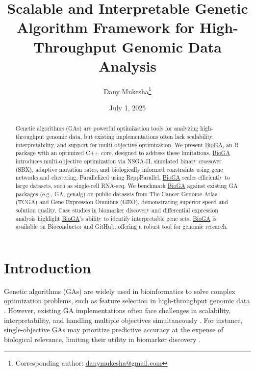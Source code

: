 \documentclass{report}
\begin{document}
\title{Scalable and Interpretable Genetic Algorithm Framework for High-Throughput Genomic Data Analysis}
\author{Dany Mukesha\thanks{Corresponding author: \href{mailto:danymukesha@gmail.com}{danymukesha@gmail.com}}}
\date{July 1, 2025}
\maketitle

\begin{abstract}
Genetic algorithms (GAs) are powerful optimization tools for analyzing high-throughput genomic data, but existing implementations often lack scalability, interpretability, and support for multi-objective optimization. We present \textcolor{teal}{\textcolor{teal}{\href{https://bioconductor.org/packages/release/bioc/html/BioGA.html}{BioGA}}}, an R package with an optimized C++ core, designed to address these limitations. \textcolor{teal}{\href{https://bioconductor.org/packages/release/bioc/html/BioGA.html}{BioGA}} introduces multi-objective optimization via NSGA-II, simulated binary crossover (SBX), adaptive mutation rates, and biologically informed constraints using gene networks and clustering. Parallelized using RcppParallel, \textcolor{teal}{\href{https://bioconductor.org/packages/release/bioc/html/BioGA.html}{BioGA}} scales efficiently to large datasets, such as single-cell RNA-seq. We benchmark \textcolor{teal}{\href{https://bioconductor.org/packages/release/bioc/html/BioGA.html}{BioGA}} against existing GA packages (e.g., GA, genalg) on public datasets from The Cancer Genome Atlas (TCGA) and Gene Expression Omnibus (GEO), demonstrating superior speed and solution quality. Case studies in biomarker discovery and differential expression analysis highlight \textcolor{teal}{\href{https://bioconductor.org/packages/release/bioc/html/BioGA.html}{BioGA}}’s ability to identify interpretable gene sets. \textcolor{teal}{\href{https://bioconductor.org/packages/release/bioc/html/BioGA.html}{BioGA}} is available on Bioconductor and GitHub, offering a robust tool for genomic research.
\end{abstract}

\section{Introduction}
Genetic algorithms (GAs) are widely used in bioinformatics to solve complex optimization problems, such as feature selection in high-throughput genomic data \citep{Li2023}. However, existing GA implementations often face challenges in scalability, interpretability, and handling multiple objectives simultaneously \citep{Wang2024}. For instance, single-objective GAs may prioritize predictive accuracy at the expense of biological relevance, limiting their utility in biomarker discovery \citep{Zhao2023,Yu2021}.
\end{document}
